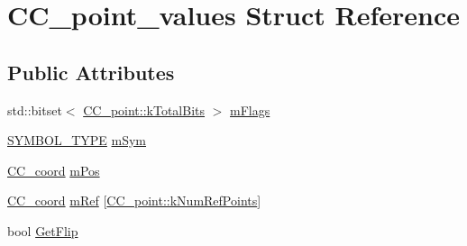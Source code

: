 \hypertarget{a00035}{\section{C\-C\-\_\-point\-\_\-values Struct Reference}
\label{a00035}
}
\subsection*{Public Attributes}
\begin{DoxyCompactItemize}
\item 
std\-::bitset$<$ \hyperlink{a00034_aa09d4a78d659a5809cc4ca1e7022c84aac65d0716d4049256924dd894d9935221}{C\-C\-\_\-point\-::k\-Total\-Bits} $>$ \hyperlink{a00035_aaba0cdfb77d6416849ad4cc44c49acb6}{m\-Flags}
\item 
\hyperlink{a00216_a68cd84e0300be6f9ff4474682762c9ee}{S\-Y\-M\-B\-O\-L\-\_\-\-T\-Y\-P\-E} \hyperlink{a00035_aecc6f13cb613498e3c307a4be4353075}{m\-Sym}
\item 
\hyperlink{a00029}{C\-C\-\_\-coord} \hyperlink{a00035_afd2d71183219ead4687efa86e8fa6904}{m\-Pos}
\item 
\hyperlink{a00029}{C\-C\-\_\-coord} \hyperlink{a00035_ab8797ebb0797a22c1d90091265c822f2}{m\-Ref} \mbox{[}\hyperlink{a00034_a2b34de427e5864328fd455f3122d96f4}{C\-C\-\_\-point\-::k\-Num\-Ref\-Points}\mbox{]}
\item 
bool \hyperlink{a00035_adbd7c0d6e0412fc07d964551bb2ad9a1}{Get\-Flip}
\end{DoxyCompactItemize}


